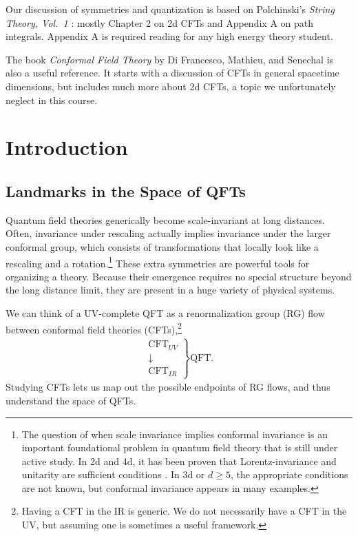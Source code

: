 \documentclass[11pt]{ws-rv9x6}
\newif\ifarxivsubmission
\newcommand\be{\begin{eqnarray}}
\newcommand\ee{\end{eqnarray}}
\newcommand\<\langle
\renewcommand\>\rangle
\renewcommand\.{\cdot}
\begin{document}
Our discussion of symmetries and quantization is based on Polchinski's {\it String Theory, Vol.\ 1} \cite{Polchinski:1998rq}: mostly Chapter 2 on 2d CFTs and Appendix A on path integrals.  Appendix A is required reading for any high energy theory student.

The book {\it Conformal Field Theory\/} by Di Francesco, Mathieu, and Senechal \cite{YellowPages} is also a useful reference. It starts with a discussion of CFTs in general spacetime dimensions, but includes much more about 2d CFTs, a topic we unfortunately neglect in this course.

\ifarxivsubmission
  \newpage
\fi

\section{Introduction}

\subsection{Landmarks in the Space of QFTs}

Quantum field theories generically become scale-invariant at long distances. Often, invariance under rescaling actually implies invariance under the larger conformal group, which consists of transformations that locally look like a rescaling and a rotation.\footnote{The question of when scale invariance implies conformal invariance is an important foundational problem in quantum field theory that is still under active study.  In 2d and 4d, it has been proven that Lorentz-invariance and unitarity are sufficient conditions \cite{Polchinski:1987dy,Dymarsky:2013pqa}.  In 3d or $d\geq 5$, the appropriate conditions are not known, but conformal invariance appears in many examples.}  These extra symmetries are powerful tools for organizing a theory. Because their emergence requires no special structure beyond the long distance limit, they are present in a huge variety of physical systems.

We can think of a UV-complete QFT as a renormalization group (RG) flow between conformal field theories (CFTs),\footnote{Having a CFT in the IR is generic.  We do not necessarily have a CFT in the UV, but assuming one is sometimes a useful framework.}
\be
\left.
\begin{array}{c}
\mathrm{CFT}_{UV}\\
\downarrow\\
\mathrm{CFT}_{IR}
\end{array}\right\} \mathrm{QFT}.
\ee
Studying CFTs lets us map out the possible endpoints of RG flows, and thus understand the space of QFTs.
\end{document}
